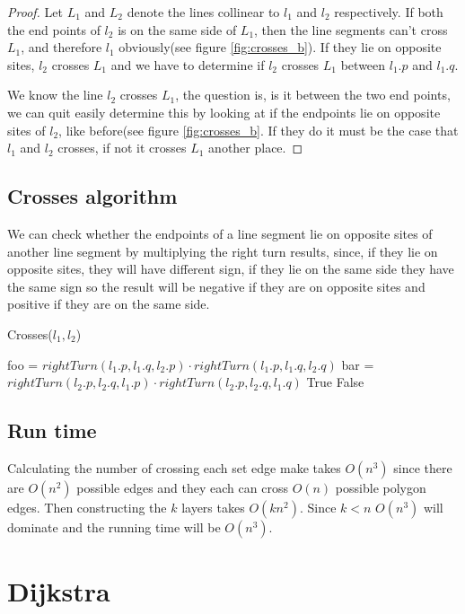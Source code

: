 \begin{proof}
Let $L_1$ and $L_2$ denote the lines collinear to $l_1$ and $l_2$ respectively.
	If both the end points of $l_2$ is on the same side of $L_1$, then the line
	segments can't cross $L_1$, and therefore $l_1$ obviously(see figure
	\ref{fig:crosses_b}). If they lie on opposite sites, $l_2$ crosses $L_1$ and
	we have to determine if $l_2$ crosses $L_1$ between $l_1.p$ and $l_1.q$. 

We know the line $l_2$ crosses $L_1$, the question is, is it between the two
	end points, we can quit easily determine this by looking at if the endpoints
	lie on opposite sites of $l_2$, like before(see figure \ref{fig:crosses_b}.
	If they do it must be the case that $l_1$ and $l_2$ crosses, if not it
	crosses $L_1$ another place.
\end{proof}

\subsection{Crosses algorithm}
We can check whether the endpoints of a line segment lie on opposite sites of another
line segment by multiplying the right turn results, since, if they lie on opposite sites,
they will have different sign, if they lie on the same side they have the same
sign so the result will be negative if they are on opposite sites and positive
if they are on the same side.

\begin{algorithm}[H]
	\caption{Crosses($l_1,l_2$)}
	\begin{algorithmic}[1] 
		\State foo = $rightTurn(l_1.p,l_1.q,l_2.p)\cdot
		rightTurn(l_1.p,l_1.q,l_2.q)$
		\State bar = $rightTurn(l_2.p,l_2.q,l_1.p)\cdot
		rightTurn(l_2.p,l_2.q,l_1.q)$
		\State \Return True
		\Else
		\State \Return False
		\EndIf
	\end{algorithmic}
\end{algorithm}

\subsection{Run time}
Calculating the number of crossing each set edge make takes $O(n^3)$ since
there are $O(n^2)$ possible edges and they each can cross $O(n)$ possible
polygon edges. Then constructing the $k$ layers takes $O(k n^2)$. Since $k<n$
$O(n^3)$ will dominate and the running time will be $O(n^3)$.

\section{Dijkstra}

